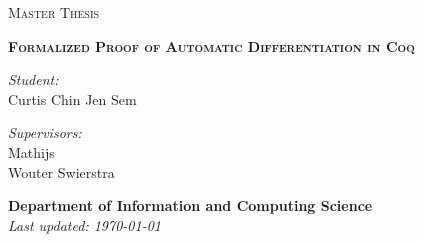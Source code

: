 \begin{titlepage}

    \begin{figure}
       \begin{minipage}{0.48\textwidth}
       \begin{flushleft}
       \end{flushleft}
       \end{minipage}\hfill
       \begin{minipage}{0.48\textwidth}
       \begin{flushright}
       \end{flushright}
       \end{minipage}
    \end{figure}

    \thispagestyle{fancy}

    \vspace{1in}

    \center

    \textsc{\large Master Thesis}

    \vspace{0.5in}

    \noindent\makebox[\linewidth]{\rule{\linewidth}{1.2pt}}
    \textsc{\textbf{\large Formalized Proof of Automatic Differentiation in Coq}}
    \noindent\makebox[\linewidth]{\rule{\linewidth}{1.2pt}}

    \vspace{0.5in}

    \begin{minipage}{0.48\textwidth}
        \begin{flushleft}
            \textit{Student:} \\
            Curtis Chin Jen Sem \\
        \end{flushleft}
    \end{minipage}
    \begin{minipage}{0.48\textwidth}
        \begin{flushright}
        \textit{Supervisors:} \\
        Mathijs \Vakar \\
        Wouter Swierstra \\
        \end{flushright}
    \end{minipage}

    \vspace{2in}

    \textbf{\large Department of Information and Computing Science} \\
    \textit{Last updated: \today}
\end{titlepage}
